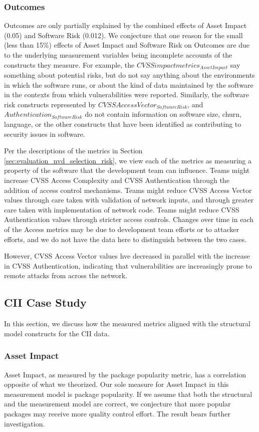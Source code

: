 \subsubsection{Outcomes}
Outcomes are only partially explained by the combined effects of Asset Impact (0.05) and Software Risk (0.012). We conjecture that one reason for the small (less than 15\%) effects of Asset Impact and Software Risk on Outcomes are due to the underlying measurement variables being incomplete accounts of the constructs they measure. For example, the $CVSS impact metrics_{Asset Impact}$ say something about potential risks, but do not say anything about the environments in which the software runs, or about the kind of data maintained by the software in the contexts from which vulnerabilities were reported. Similarly, the software risk constructs represented by $CVSS Access Vector_{Software Risk}$, and $Authentication_{Software Risk}$ do not contain information on software size, churn, language, or the other constructs that have been identified as contributing to security issues in software.   

Per the descriptions of the metrics in Section \ref{sec:evaluation_nvd_selection_risk}, we view each of the metrics as measuring a property of the software that the development team can influence. Teams might increase CVSS Access Complexity and CVSS Authentication through the addition of access control mechanisms. Teams might reduce CVSS Access Vector values through care taken with validation of network inputs, and through greater care taken with implementation of network code. Teams might reduce CVSS Authentication values through stricter access controls. Changes over time in each of the Access metrics may be due to development team efforts or to attacker efforts, and we do not have the data here to distinguish between the two cases.  

However, CVSS Access Vector values hve decreased in parallel with the increase in CVSS Authentication, indicating that vulnerabilities are increasingly prone to remote attacks from across the network.

\subsection{CII Case Study}
\label{sec:case_cii_discussion}
In this section, we discuss how the measured metrics aligned with the structural model constructs for the CII data.

\subsubsection{Asset Impact} 
Asset Impact, as measured by the package popularity metric, has a correlation opposite of what we theorized. Our sole measure for Asset Impact in this measurement model is package popularity. If we assume that both the structural and the measurement model are correct, we conjecture that more popular packages may receive more quality control effort. The result bears further investigation.

